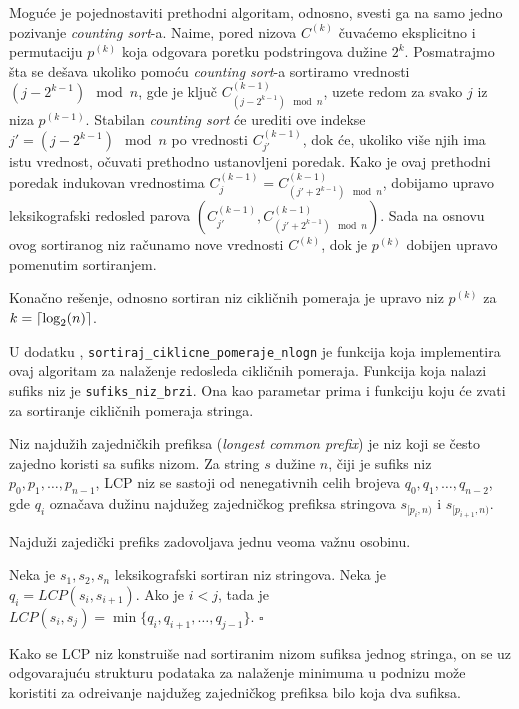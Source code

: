 Mogu\' ce je pojednostaviti prethodni algoritam, odnosno, svesti ga na samo jedno pozivanje \textit{counting sort}-a. Naime, pored nizova $C^{(k)}$ \v cuva\' cemo eksplicitno i permutaciju $p^{(k)}$ koja odgovara poretku podstringova du\v zine $2^k$. Posmatrajmo \v sta se de\v sava ukoliko pomo\' cu \textit{counting sort}-a sortiramo vrednosti $(j - 2^{k-1}) \mod n$, gde je klju\v c $C^{(k-1)}_{(j - 2^{k-1}) \mod n}$, uzete redom za svako $j$ iz niza $p^{(k-1)}$. Stabilan \textit{counting sort} \' ce urediti ove indekse $j' = (j - 2^{k-1}) \mod n$ po vrednosti $C^{(k-1)}_{j'}$, dok \' ce, ukoliko vi\v se njih ima istu vrednost, o\v cuvati prethodno ustanovljeni poredak. Kako je ovaj prethodni poredak indukovan vrednostima $C^{(k-1)}_j = C^{(k-1)}_{(j' + 2^{k-1}) \mod n}$, dobijamo upravo leksikografski redosled parova $(C^{(k-1)}_{j'}, C^{(k-1)}_{(j' + 2^{k-1}) \mod n})$. Sada na osnovu ovog sortiranog niz ra\v cunamo nove vrednosti $C^{(k)}$, dok je $p^{(k)}$ dobijen upravo pomenutim sortiranjem.

Kona\v cno re\v senje, odnosno sortiran niz cikli\v cnih pomeraja je upravo niz $p^{(k)}$ za $k = \left \lceil \log_2(n) \right \rceil$.

U dodatku \sirdodatakkod{}, \texttt{sortiraj\_ciklicne\_pomeraje\_nlogn} je funkcija koja implementira ovaj algoritam za nala\v zenje redosleda cikli\v cnih pomeraja. Funkcija koja nalazi sufiks niz je \texttt{sufiks\_niz\_brzi}. Ona kao parametar prima i funkciju koju \' ce zvati za sortiranje cikli\v cnih pomeraja stringa.


Niz najdu\v zih zajedni\v ckih prefiksa (\textit{longest common prefix}) je niz koji se \v cesto zajedno koristi sa sufiks nizom. Za string $s$ du\v zine $n$, \v ciji je sufiks niz $p_0, p_1, \ldots, p_{n-1}$, LCP niz se sastoji od nenegativnih celih brojeva $q_0, q_1, \ldots, q_{n-2}$, gde $q_i$ ozna\v cava du\v zinu najdu\v zeg zajedni\v ckog prefiksa stringova $s_{[p_i, n)}$ i $s_{[p_{i+1}, n)}$.

Najdu\v zi zajedi\v cki prefiks zadovoljava jednu veoma va\v znu osobinu.

\begin{thm}
\label{lcposobina}
Neka je $s_1, s_2, s_n$ leksikografski sortiran niz stringova. Neka je $q_i = LCP(s_i, s_{i+1})$. Ako je $i<j$, tada je $LCP(s_i, s_j) = \min\{q_i, q_{i+1}, \ldots, q_{j-1}\}$. \hfill $\square$
\end{thm}

Kako se LCP niz konstrui\v se nad sortiranim nizom sufiksa jednog stringa, on se uz odgovaraju\' cu strukturu podataka za nala\v zenje minimuma u podnizu mo\v ze koristiti za odre\dj ivanje najdu\v zeg zajedni\v ckog prefiksa bilo koja dva sufiksa.

